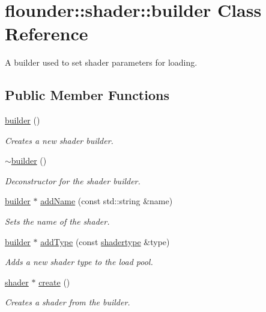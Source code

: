 \hypertarget{classflounder_1_1shader_1_1builder}{}\section{flounder\+:\+:shader\+:\+:builder Class Reference}
\label{classflounder_1_1shader_1_1builder}


A builder used to set shader parameters for loading.  


\subsection*{Public Member Functions}
\begin{DoxyCompactItemize}
\item 
\hyperlink{classflounder_1_1shader_1_1builder_a32776e257f27affda639c94667c07236}{builder} ()
\begin{DoxyCompactList}\small\item\em Creates a new shader builder. \end{DoxyCompactList}\item 
\hyperlink{classflounder_1_1shader_1_1builder_a80698ba04f5e74ac0a0023384988a55d}{$\sim$builder} ()
\begin{DoxyCompactList}\small\item\em Deconstructor for the shader builder. \end{DoxyCompactList}\item 
\hyperlink{classflounder_1_1shader_1_1builder}{builder} $\ast$ \hyperlink{classflounder_1_1shader_1_1builder_adb72c6a3a95ee90a1ff8616af3f2ba99}{add\+Name} (const std\+::string \&name)
\begin{DoxyCompactList}\small\item\em Sets the name of the shader. \end{DoxyCompactList}\item 
\hyperlink{classflounder_1_1shader_1_1builder}{builder} $\ast$ \hyperlink{classflounder_1_1shader_1_1builder_ac994656b2088dc292ff04de8b24ebdcf}{add\+Type} (const \hyperlink{classflounder_1_1shadertype}{shadertype} \&type)
\begin{DoxyCompactList}\small\item\em Adds a new shader type to the load pool. \end{DoxyCompactList}\item 
\hyperlink{classflounder_1_1shader}{shader} $\ast$ \hyperlink{classflounder_1_1shader_1_1builder_a99923013d39273486149c8fd54f6f9a9}{create} ()
\begin{DoxyCompactList}\small\item\em Creates a shader from the builder. \end{DoxyCompactList}\end{DoxyCompactItemize}
